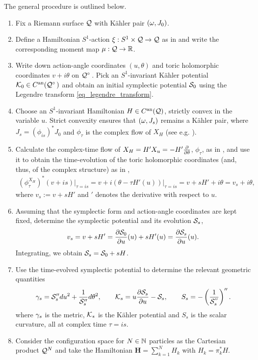 \documentclass[notas.tex]{subfiles} 				%
\begin{document}
The general procedure is outlined below. 

\begin{enumerate}
	\item Fix a Riemann surface $\mathcal{Q}$ with Kähler pair $( \omega, J_0)$.
	\item Define a Hamiltonian $S^1$-action $\xi: S^1 \times \mathcal{Q} \to \mathcal{Q}$ as in  and write the corresponding moment map $\mu: \mathcal{Q} \to \mathbb{R}$.
	\item Write down action-angle coordinates $(u, \theta)$ and toric holomorphic coordinates $v+i\theta$ on $\nfld^\circ$. Pick an $S^1$-invariant Kähler potential $\kpot_0 \in C^\ra(\nfld^\circ)$ and obtain an initial symplectic potential $\mathcal{S}_0$ using the Legendre transform \eqref{eq_legendre_transform}.
	\item Choose an $S^1$-invariant Hamiltonian $H \in C^{\text{an}}(\mathcal{Q})$, strictly convex in the variable $u$. Strict convexity ensures that $(\omega, J_s)$ remains a Kähler pair, where $J_s = (\phi_{is})^* J_0$ and $\phi_{\tau}$ is the complex flow of $X_H$ (see e.g. \cite[Section 2.3]{baier_toric_2011}). 
	\item Calculate the complex-time flow of $X_H = H' X_u = - H' \frac{\partial }{\partial \theta}$, $\phi_\tau$, as in , and use it to obtain the time-evolution of the toric holomorphic coordinates (and, thus, of the complex structure) as in ,
	\begin{align} \label{eq_cylinder_ktoric_evolution}
		\left ( \phi_\tau^{X_H} \right )^* (v+is) \big|_{\tau=is} = v + i(\theta - \tau H'(u)) \big|_{\tau=is} = v + sH' + i \theta = v_{s} + i \theta,
	\end{align}
	where $v_{s} := v + sH'$ and $'$ denotes the derivative with respect to $u$.
	\item \label{intro_symplectic_evolution} Assuming that the symplectic form and action-angle coordinates are kept fixed, determine the symplectic potential and its evolution $\mathcal{S}_s$,
	\begin{align*}
		v_{s} = v + sH' = \frac{\partial \mathcal{S}_0}{\partial u}(u) + sH'(u) = \frac{\partial \mathcal{S}_{s}}{\partial u}(u).
	\end{align*}
	Integrating, we obtain $\mathcal{S}_{s} = \mathcal{S}_0 + sH$.
	\item Use the time-evolved symplectic potential to determine the relevant geometric quantities
	\begin{align*}
		\gamma_s = \mathcal{S}_s'' du^2 + \frac{1}{\mathcal{S}_s''} d \theta^2, \qquad
		\mathcal{K}_s = u\frac{\partial \mathcal{S}_s}{\partial u} - \mathcal{S}_s,  \qquad
		S_s = - \left ( \frac{1}{\mathcal{S}_s^{''}} \right )''.
	\end{align*}
	where $\gamma_s$ is the metric, $\mathcal{K}_s$ is the Kähler potential and $S_s$ is the scalar curvature, all at complex time $\tau=is$.
	\item Consider the configuration space for $N \in \mathbb{N}$ particles as the Cartesian product $\mathcal{Q}^N$ and take the Hamiltonian $\bm{H} = \sum_{k=1}^{N} H_k$ with $H_k = \pi_k^*H$.
	

\end{enumerate}
\end{document}
